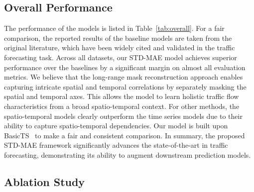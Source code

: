 \documentclass[letterpaper]{article} \usepackage{aaai24}  \usepackage{times}  \usepackage{helvet}  \usepackage{courier}  \usepackage[hyphens]{url}  \usepackage{graphicx} \urlstyle{rm} \def\UrlFont{\rm}  \usepackage{natbib}  \usepackage{caption} \frenchspacing  \setlength{\pdfpagewidth}{8.5in} \setlength{\pdfpageheight}{11in} \usepackage{algorithm}
\begin{document}
\subsection{Overall Performance}\label{sec:experiment-overall}


The performance of the models is listed in Table~\ref{tab:overall}. For a fair comparison, the reported results of the baseline models are taken from the original literature, which have been widely cited and validated in the traffic forecasting task. Across all datasets, our STD-MAE model achieves superior performance over the baselines by a significant margin on almost all evaluation metrics. We believe that the long-range mask reconstruction approach enables capturing intricate spatial and temporal correlations by separately masking the spatial and temporal axes. This allows the model to learn holistic traffic flow characteristics from a broad spatio-temporal context. For other methods, the spatio-temporal models clearly outperform the time series models due to their ability to capture spatio-temporal dependencies. Our model is built upon BasicTS~\cite{shao2023exploring} to make a fair and consistent comparison. In summary, the proposed STD-MAE framework significantly advances the state-of-the-art in traffic forecasting, demonstrating its ability to augment downstream prediction models.


\subsection{Ablation Study}
\end{document}
